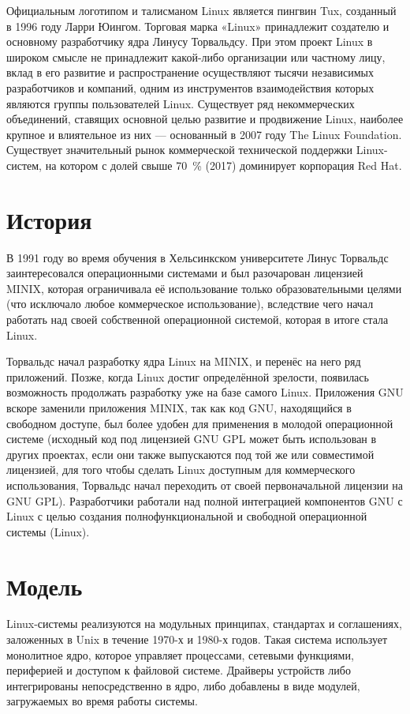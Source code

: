 Официальным логотипом и талисманом Linux является пингвин Tux, созданный в 1996 году Ларри Юингом. Торговая марка «Linux» принадлежит создателю и основному разработчику ядра Линусу Торвальдсу. При этом проект Linux в широком смысле не принадлежит какой-либо организации или частному лицу, вклад в его развитие и распространение осуществляют тысячи независимых разработчиков и компаний, одним из инструментов взаимодействия которых являются группы пользователей Linux. Существует ряд некоммерческих объединений, ставящих основной целью развитие и продвижение Linux, наиболее крупное и влиятельное из них — основанный в 2007 году The Linux Foundation. Существует значительный рынок коммерческой технической поддержки Linux-систем, на котором с долей свыше 70~\% (2017) доминирует корпорация Red Hat.
\newpage

\chapter*{История}
\par В 1991 году во время обучения в Хельсинкском университете Линус Торвальдс заинтересовался операционными системами и был разочарован лицензией MINIX, которая ограничивала её использование только образовательными целями (что исключало любое коммерческое использование), вследствие чего начал работать над своей собственной операционной системой, которая в итоге стала Linux.

Торвальдс начал разработку ядра Linux на MINIX, и перенёс на него ряд приложений. Позже, когда Linux достиг определённой зрелости, появилась возможность продолжать разработку уже на базе самого Linux. Приложения GNU вскоре заменили приложения MINIX, так как код GNU, находящийся в свободном доступе, был более удобен для применения в молодой операционной системе (исходный код под лицензией GNU GPL может быть использован в других проектах, если они также выпускаются под той же или совместимой лицензией, для того чтобы сделать Linux доступным для коммерческого использования, Торвальдс начал переходить от своей первоначальной лицензии на GNU GPL). Разработчики работали над полной интеграцией компонентов GNU с Linux с целью создания полнофункциональной и свободной операционной системы (Linux).
\newpage

\chapter*{Модель}
\par Linux-системы реализуются на модульных принципах, стандартах и соглашениях, заложенных в Unix в течение 1970-х и 1980-х годов. Такая система использует монолитное ядро, которое управляет процессами, сетевыми функциями, периферией и доступом к файловой системе. Драйверы устройств либо интегрированы непосредственно в ядро, либо добавлены в виде модулей, загружаемых во время работы системы.

